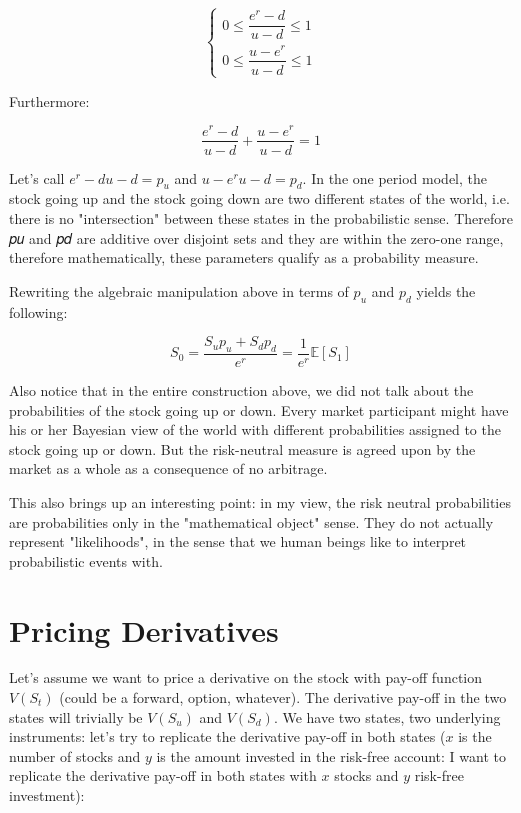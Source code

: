 \begin{equation}
\begin{cases}
0 \le \dfrac{𝑒^{𝑟}−𝑑}{𝑢−𝑑} \le 1 \\ 
0 \le \dfrac{𝑢−𝑒^{r}}{𝑢−𝑑} \le 1
\end{cases}
\end{equation}

Furthermore:

\begin{equation*}
\frac{𝑒^{𝑟}−𝑑}{𝑢−𝑑}+\frac{𝑢−𝑒^{𝑟}}{𝑢−𝑑}=1
\end{equation*}

Let's call $𝑒^{𝑟}−𝑑𝑢−𝑑 = 𝑝_𝑢$ and $𝑢−𝑒^{𝑟}𝑢−𝑑 = 𝑝_𝑑$. In the one period model, the stock going up and the stock going down are two different states of the world, i.e. there is no "intersection" between these states in the probabilistic sense. Therefore 𝑝𝑢 and 𝑝𝑑 are additive over disjoint sets and they are within the zero-one range, therefore mathematically, these parameters qualify as a probability measure.

Rewriting the algebraic manipulation above in terms of $𝑝_𝑢$ and $𝑝_𝑑$ yields the following:

\begin{equation}
𝑆_0=\frac{𝑆_𝑢 𝑝_𝑢 +𝑆_𝑑 𝑝_𝑑}{𝑒^{𝑟}}=\frac{1}{𝑒^{r}}\mathbb{E}[𝑆_1]
\end{equation}

Also notice that in the entire construction above, we did not talk about the probabilities of the stock going up or down. Every market participant might have his or her Bayesian view of the world with different probabilities assigned to the stock going up or down. But the risk-neutral measure is agreed upon by the market as a whole as a consequence of no arbitrage.

This also brings up an interesting point: in my view, the risk neutral probabilities are probabilities only in the "mathematical object" sense. They do not actually represent "likelihoods", in the sense that we human beings like to interpret probabilistic events with.

\section{Pricing Derivatives}
Let's assume we want to price a derivative on the stock with pay-off function $𝑉(𝑆_𝑡)$ (could be a forward, option, whatever). The derivative pay-off in the two states will trivially be $𝑉(𝑆_𝑢)$ and $𝑉(𝑆_𝑑)$. We have two states, two underlying instruments: let's try to replicate the derivative pay-off in both states ($𝑥$ is the number of stocks and $𝑦$ is the amount invested in the risk-free account: I want to replicate the derivative pay-off in both states with $𝑥$ stocks and $𝑦$ risk-free investment):


